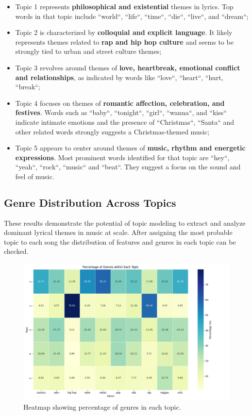 \begin{itemize}
     \item Topic 1 represents \textbf{philosophical and existential} themes in lyrics.
      Top words in that topic include ``world``, ``life``, ``time``, ``die``,
      ``live``, and ``dream``;
    \item Topic 2 is characterized by \textbf{colloquial and explicit
      language}. It likely represents themes related to \textbf{rap and hip hop culture}
      and seems to be strongly tied to urban and street culture themes;
    \item Topic 3 revolves around themes of \textbf{love, heartbreak, emotional
      conflict and relationships}, as indicated by words like ``love``,
      ``heart``, ``hurt, ``break``;
    \item Topic 4 focuses on themes of \textbf{romantic affection, celebration,
      and festives}. Words such as ``baby``, ``tonight``, ``girl``, ``wanna``,
      and ``kiss`` indicate intimate emotions and the presence of
      ``Christmas``, ``Santa`` and other related words strongly suggests a
      Christmas-themed music;
    \item Topic 5 appears to center around themes of \textbf{music, rhythm and
      energetic expressions}. Most prominent words identified for that topic
      are ``hey``, ``yeah``, ``rock``, ``music`` and ``beat``. They suggest a
      focus on the sound and feel of music. 
\end{itemize}


\subsection{Genre Distribution Across Topics}
These results demonstrate the potential of topic modeling to extract and
analyze dominant lyrical themes in music at scale. After assigning the most
probable topic to each song the distribution of features and genres in each
topic can be checked.


\begin{center}
\begin{figure}[H]
  \centering
  \includegraphics[width=6in]{img/lda_genres_distribution.png}
  \caption{Heatmap showing percentage of genres in each topic.}
  \label{Figure:lda_genres_distribution}
\end{figure}
\end{center}

